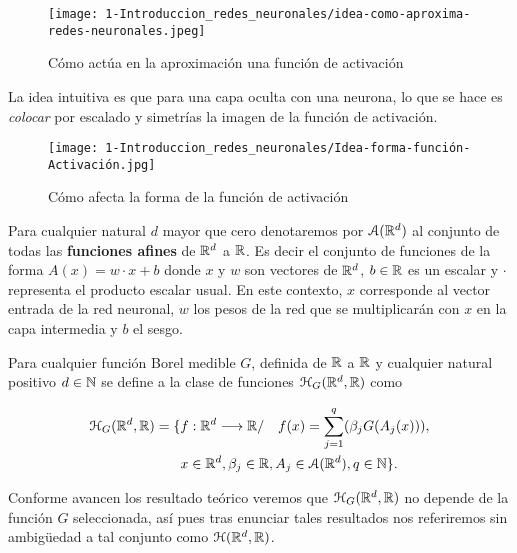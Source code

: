 \begin{figure}[H]
    \texttt{[image: 1-Introduccion\_redes\_neuronales/idea-como-aproxima-redes-neuronales.jpeg]}
    \caption{Cómo actúa en la aproximación una función de activación}
    \label{img:idea-como-aproxima-redes-neuronales}
   \end{figure}

La idea intuitiva es que para una capa oculta con una neurona, 
lo que se hace es \textit{colocar} por escalado y simetrías la imagen de la función de activación. 

\begin{figure}[h!]
    \texttt{[image: 1-Introduccion\_redes\_neuronales/Idea-forma-función-Activación.jpg]}
    \caption{Cómo afecta la forma de la función de activación}
    \label{img:como afecta la forma de la función de aproximación}
\end{figure}


Para cualquier natural $d$ mayor que cero  denotaremos por $\mathcal{A}(\mathbb{R}^d)$ al conjunto de todas 
las \textbf{funciones afines} de $\mathbb{R}^d$ a $\mathbb{R}$. Es decir el conjunto de funciones de la forma 
$A(x) = w \cdot x + b$ donde $x$ y $w$ son vectores de $\mathbb{R}^d$,  $b \in \mathbb{R}$ es un escalar
 y $\cdot$ representa el producto escalar
usual. En este contexto, $x$ corresponde al vector entrada de la red neuronal, $w$ los pesos de la red
que se multiplicarán con $x$ en la capa intermedia y $b$ el sesgo. 

\begin{definicion} 
    Para cualquier función Borel medible $G$, definida de $\mathbb{R}$ a $\mathbb{R}$ y cualquier natural positivo
    $d \in \mathbb{N}$ se define a la clase de funciones $\mathcal{H}_G(\mathbb{R}^d,\mathbb{R})$ como 

    \begin{equation}
        \begin{split}
        \mathcal{H}_G(\mathbb{R}^d,\mathbb{R}) = 
        \{ 
            & f: \mathbb{R} ^d \longrightarrow \mathbb{R} / \quad
            f(x)=\sum_{j = 1} ^q (
            \beta_j G(A_{j}(x))), \\
            & x  \in \mathbb{R} ^d, \beta_j \in \mathbb{R}, A_{j}\in \mathcal{A}(\mathbb{R}^d),q \in \mathbb{N}
        \}.
        \end{split}
    \end{equation}

    Conforme avancen los resultado teórico veremos que $\mathcal{H}_G(\mathbb{R}^d,\mathbb{R})$ 
    no depende de la función $G$ seleccionada, así pues tras enunciar tales resultados nos referiremos sin ambigüedad a tal conjunto como $\mathcal{H}(\mathbb{R}^d,\mathbb{R})$.
\end{definicion}


